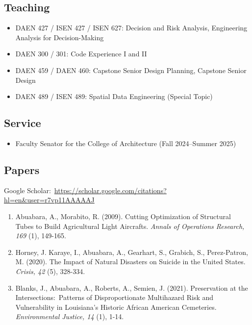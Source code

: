 \documentclass[11pt]{article}
\begin{document}
\subsection*{Teaching}
\vspace{-5pt}
\begin{itemize}[leftmargin=20pt]
\item DAEN 427 / ISEN 427 / ISEN 627: Decision and Risk Analysis, Engineering Analysis for Decision-Making
\item DAEN 300 / 301: Code Experience I and II
\item DAEN 459 / DAEN 460: Capstone Senior Design Planning, Capstone Senior Design
\item DAEN 489 / ISEN 489: Spatial Data Engineering (Special Topic)
\end{itemize}

\subsection*{Service}
\vspace{-5pt}
\begin{itemize}[leftmargin=20pt]
\item Faculty Senator for the College of Architecture (Fall 2024--Summer 2025)
\end{itemize}

\subsection*{Papers}
\vspace{-5pt}
{Google Scholar:~\url{https://scholar.google.com/citations?hl=en&user=r7vp11AAAAAJ}}
\begin{enumerate}[leftmargin=20pt]
\item Abuabara, A., Morabito, R. (2009). Cutting Optimization of Structural Tubes to Build Agricultural Light Aircrafts. \emph{Annals of Operations Research, 169} (1), 149-165.
\item Horney, J. Karaye, I., Abuabara, A., Gearhart, S., Grabich, S., Perez-Patron, M. (2020). The Impact of Natural Disasters on Suicide in the United States. \emph{Crisis, 42} (5), 328-334.
\item Blanks, J., Abuabara, A., Roberts, A., Semien, J. (2021). Preservation at the Intersections:~Patterns of Disproportionate Multihazard Risk and Vulnerability in Louisiana's Historic African American Cemeteries. \emph{Environmental Justice, 14} (1), 1-14.
\end{enumerate}
\end{document}
